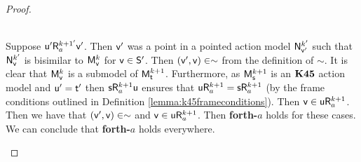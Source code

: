 \begin{proof}
\begin{itemize}
\begin{itemize}
	\\
	Suppose $\evu' \evR^{k+1'}_a \evv'$.
	Then $\evv'$ was a point in a pointed action model $\evM^{k'}_{\evv'}$ such that $\evM^{k'}_{\evv}$
	is bisimilar to $\evMM^{k}_{\evv}$ for $\evv \in \evS'$.
	Then $(\evv',\evv) \in \sim$ from the definition of $\sim$.
	It is clear that $\evMM^k_\evv$ is a submodel of $\evMM^{k+1}_{\evt}$.
	Furthermore, as $\evMM^{k+1}_\evs$ is an $\AXKFF$ action model and $\evu' = \evt'$ then $\evs
	\evR^{k+1}_a \evu$ ensures that $\evu \evR^{k+1}_a = \evs \evR^{k+1}_a$ (by the frame conditions
	outlined in Definition \ref{lemma:k45frameconditions}).
	Then $\evv \in \evu \evR^{k+1}_a$.
	Then we have that $(\evv',\evv) \in \sim$ and $\evv \in \evu \evR^{k+1}_a$.
	Then {\bf forth-$a$} holds for these cases.
	We can conclude that {\bf forth-$a$} holds everywhere.
	\end{itemize}


\end{itemize}
\end{proof}
